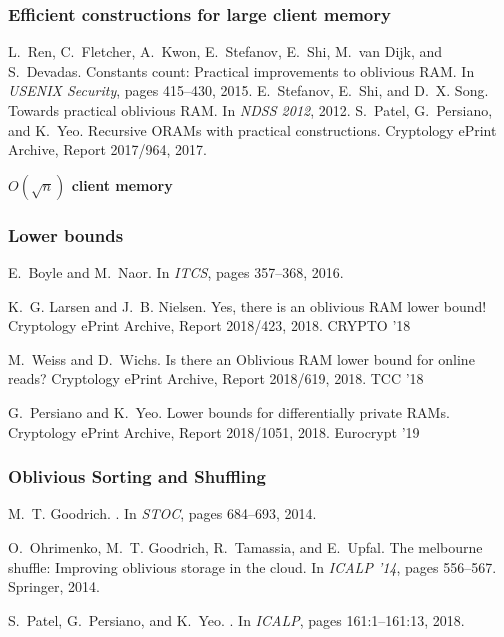 \documentclass[]{beamer}
\begin{document}
\begin{frame}
\frametitle{Efficient constructions for large client memory}
\begin{thebibliography}{10}
L.~Ren, C.~Fletcher, A.~Kwon, E.~Stefanov, E.~Shi, M.~van Dijk, and S.~Devadas.
\newblock Constants count: Practical improvements to oblivious {RAM}.
\newblock In {\em USENIX Security}, pages 415--430, 2015.
E.~Stefanov, E.~Shi, and D.~X. Song.
\newblock Towards practical oblivious {RAM}.
\newblock In {\em {NDSS} 2012}, 2012.
S.~Patel, G.~Persiano, and K.~Yeo.
\newblock Recursive ORAMs with practical constructions.
\newblock Cryptology ePrint Archive, Report 2017/964, 2017.
\end{thebibliography}

\vfill
{\color{brown} \bf $O(\sqrt{n})$ client memory}
\end{frame}

\begin{frame}
\frametitle{Lower bounds}

\begin{thebibliography}{10}
E.~Boyle and M.~Naor.
\newblock In {\em ITCS}, pages 357--368, 2016.

K.~G. Larsen and J.~B. Nielsen.
\newblock Yes, there is an oblivious {RAM} lower bound!
\newblock Cryptology ePrint Archive, Report 2018/423, 2018.
\newblock CRYPTO '18

M.~Weiss and D.~Wichs.
\newblock Is there an {O}blivious {RAM} lower bound for online reads?
\newblock Cryptology ePrint Archive, Report 2018/619, 2018.
\newblock TCC '18

G.~Persiano and K.~Yeo.
\newblock Lower bounds for differentially private {RAM}s.
\newblock Cryptology ePrint Archive, Report 2018/1051, 2018.
\newblock Eurocrypt '19


\end{thebibliography}
\end{frame}

\begin{frame}
\frametitle{Oblivious Sorting and Shuffling}

\begin{thebibliography}{10}

M.~T. Goodrich.
.
\newblock In {\em STOC}, pages 684--693, 2014.

O.~Ohrimenko, M.~T. Goodrich, R.~Tamassia, and E.~Upfal.
\newblock The melbourne shuffle: Improving oblivious storage in the cloud.
\newblock In {\em ICALP '14}, pages 556--567. Springer, 2014.


S.~Patel, G.~Persiano, and K.~Yeo.
.
\newblock In {\em ICALP}, pages 161:1--161:13, 2018.

\end{thebibliography}
\end{frame}
\end{document}
